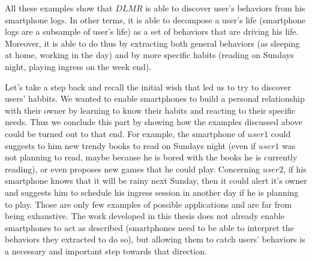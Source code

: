 All these examples show that $DLMR$ is able to discover user's behaviors from his smartphone logs. In other terms, it is able to decompose a user's life (smartphone logs are a subsample of user's life) as a set of behaviors that are driving his life. Moreover, it is able to do thus by extracting both general behaviors (as sleeping at home, working in the day) and by more specific habits (reading on Sundays night, playing ingress on the week end). \par

Let's take a step back and recall the initial wish that led us to try to discover users' habbits. We wanted to enable smartphones to build a personal relationship with their owner by learning to know their habits and reacting to their specific needs. Thus we conclude this part by showing how the examples discussed above could be turned out to that end. For example, the smartphone of $user1$ could suggests to him new trendy books to read on Sundays night (even if $user1$ was not planning to read, maybe because he is bored with the books he is currently reading), or even proposes new games that he could play. Concerning $user2$, if his smartphone knows that it will be rainy next Sunday, then it could alert it's owner and suggests him to schedule his ingress session in another day if he is planning to play. Those are only few examples of possible applications and are far from being exhaustive. The work developed in this thesis does not already enable smartphones to act as described (smartphones need to be able to interpret the behaviors they extracted to do so), but allowing them to catch users' behaviors is a necessary and important step towards that direction.

